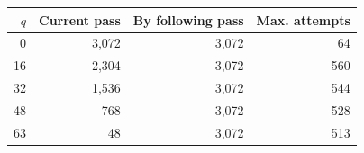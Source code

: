 \begin{tabular}{r r r r}
\toprule
$q$ & Current pass & By following pass & Max. attempts \\
\midrule
0 & 3,072 & 3,072 & 64 \\
16 & 2,304 & 3,072 & 560 \\
32 & 1,536 & 3,072 & 544 \\
48 & 768 & 3,072 & 528 \\
63 & 48 & 3,072 & 513 \\
\bottomrule
\end{tabular}
